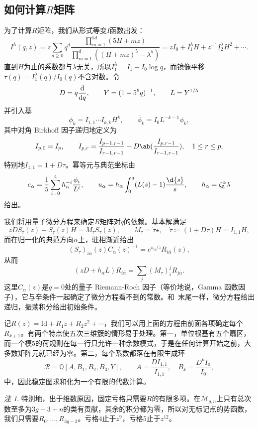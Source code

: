 \documentclass{amsart}
\theoremstyle{definition}
\theoremstyle{remark}
\newtheorem{rmk}[thm]{注}
\theoremstyle{plain}
\theoremstyle{definition}
\theoremstyle{remark}
\newcommand{\Q}{\mathbb{Q}}
\newcommand{\Mbar}{\overline{\mathcal{M}}}
\newcommand{\mc}[1]{\mathcal{#1}}
\newcommand{\mr}[1]{\mathrm{#1}}
\newcommand{\1}{\mathbf{1}}
\newcommand{\2}{\mathbf{2}}
\newcommand{\3}{\mathbf{3}}
\begin{document}
\subsection{如何计算\(R\)矩阵}%
\label{sub:How to compute the R-matrix (Guo)}

为了计算\(R\)矩阵，我们从形式等变\(I\)函数出发：
\[ I^{\lambda}(q,z) = z\sum_{d\geq0}q^d \frac{\prod_{m=1}^{5d}(5H+mz)}{\prod_{m=1}^d ((H+mz)^5 - \lambda^5)} = zI_0 + I_1^{\lambda}H + z^{-1}I_2^{\lambda}H^2 + \cdots. \]
直到\(H\)为止的系数都与\(\lambda\)无关，所以\(I_1^{\lambda} = I_1 - I_0 \log q\)，而镜像平移\(\tau(q) = I_1^{\lambda}(q)/I_0(q)\)不含对数。令
\[ D = q\odv{}{q}, \qquad Y = (1-5^5q)^{-1}, \qquad L = Y^{1/5} \]
并引入基
\[ \phi_k = I_{1,1}\cdots I_{k,k}H^k, \qquad \bar{\phi}_k = I_0 L^{-k-1}\phi_k, \]
其中对角 Birkhoff 因子递归地定义为
\[ I_{p,0} = I_p, \qquad I_{p,r} = \frac{I_{p-1,r-1}}{I_{r-1,r-1}} + D \ab( \frac{I_{p,r-1}}{I_{r-1,r-1}}), \quad 1 \leq r \leq p, \]
特别地\(I_{1,1} = 1+D\tau\)。幂等元与典范坐标由
\[ e_{\alpha} = \frac{1}{5}\sum_{i=0}^4 h_{\alpha}^{-i}\frac{\phi_i}{L^i}, \qquad u_{\alpha} = h_{\alpha}\int_0^q (L(s)-1)\frac{\d{s}}{s}, \qquad h_{\alpha} = \zeta_5^{\alpha}\lambda \]
给出。

我们将用量子微分方程来确定\(R\)矩阵对\(q\)的依赖。基本解满足
\[ zDS_{\tau}(z) + S_{\tau}(z)H = M_{\tau}S_{\tau}(z), \qquad M_{\tau} = \dot{\tau}\star, \quad \dot{\tau} \coloneqq (1+D\tau)H = I_{1,1}H, \]
而在归一化的典范方向\(\alpha\)上，驻相渐近给出
\[ (S_{\tau})_{i\bar{\alpha}}(z)C_{\alpha}(z)^{-1} = e^{u_{\alpha}/z}R_{i\bar{\alpha}}(z), \]
从而
\[ (zD+h_{\alpha}L)R_{i\bar{\alpha}} = \sum_j (M_{\tau})_i^j R_{j\bar{\alpha}}. \]
这里\(C_{\alpha}(z)\)是\(q=0\)处的量子 Riemann-Roch 因子（等价地说，Gamma 函数因子），它与辛条件一起确定了微分方程看不到的常数。和~末尾一样，微分方程给出递归，振荡积分给出初始条件。

记\(R(z) = \mr{Id} + R_1 z + R_2 z^2 + \cdots\)，我们可以用上面的方程由前面各项确定每个\(R_{k+1}\)。有两个特点使五次三维簇的情形易于处理。第一，单位根基有五个扇区，而一个模\(5\)的荷规则在每一行只允许一种余数模式，于是在任何计算开始之前，大多数矩阵元就已经为零。第二，每个系数都落在有限生成环
\[ \mc{R} = \Q[A,B_1,B_2,B_3,Y], \qquad A = \frac{DI_{1,1}}{I_{1,1}}, \quad B_k = \frac{D^k I_0}{I_0}, \]
中，因此稳定图求和化为一个有限的代数计算。

\begin{rmk}
    特别地，出于维数原因，固定亏格只需要\(R\)的有限多项。在\(\Mbar_{g,n}\)上只有总次数至多为\(3g-3+n\)的类有贡献，其余的积分都为零，所以对无标记点的势函数，我们只需要\(R_0, \ldots, R_{3g-3}\)。亏格\(4\)止于\(z^9\)，亏格\(5\)止于\(z^{12}\)。
\end{rmk}
\end{document}
